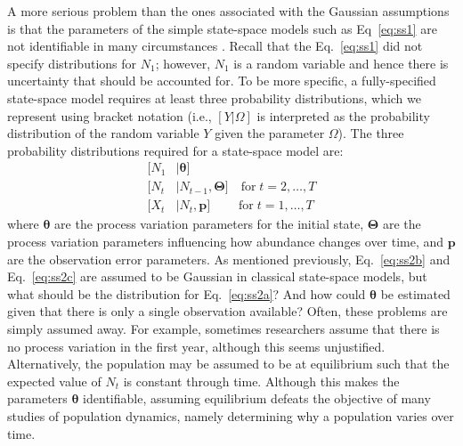 \documentclass[12pt]{article}
\begin{document}
A more serious problem than the ones associated with the Gaussian
assumptions is that the parameters of the simple state-space models
such as Eq~\ref{eq:ss1} are not identifiable in many
circumstances \citep{polansky_etal:2009}. Recall that the
Eq.~\ref{eq:ss1} did not specify distributions for $N_1$; %
however, $N_1$ is a random variable and hence there is uncertainty
that should be accounted for.
To be more specific, a fully-specified state-space model requires at least
three probability distributions, which we represent
using bracket notation (i.e., $[Y|\Omega]$ is interpreted
as the probability distribution of the random variable $Y$ given the
parameter $\Omega$). The three probability distributions required for a
state-space model are:
\begin{subequations}
  \label{eq:ss2}
  \begin{align}
    [N_1&|\bm{\theta}] \label{eq:ss2a} \\ \label{eq:ss2b}
[N_t&|N_{t-1},\bm{\Theta}] \quad \text{for} \; t=2,\hdots,T \\
\label{eq:ss2c}
    [X_t&|N_t,\bm{p}]  \qquad \; \text{for} \; t=1,\hdots,T
  \end{align}
\end{subequations}
where $\bm{\theta}$ are the process variation parameters for the
initial state, $\bm{\Theta}$ are the process variation parameters
influencing how abundance changes over time, and $\bm{p}$ are the
observation error parameters. As mentioned previously, Eq.~\ref{eq:ss2b}
and Eq.~\ref{eq:ss2c} are assumed to be Gaussian in classical state-space
models, but what should be the distribution for Eq.~\ref{eq:ss2a}?
And how could $\bm{\theta}$ be estimated given that there is only a single observation
available? Often, these problems are simply assumed away. For
example, sometimes researchers assume that there is no process variation in
the first year, although this seems unjustified. Alternatively, the
population may be assumed to be at equilibrium such that the expected
value of $N_t$ is constant through time. Although this 
makes the parameters $\bm{\theta}$ identifiable, assuming equilibrium
defeats the objective of many studies of population dynamics, namely
determining why a population varies over time.
\end{document}
